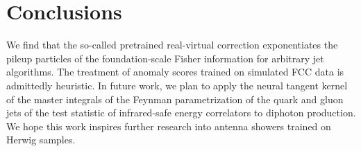 \section{Conclusions}\label{sec:conclusions}

We find that the so-called pretrained real-virtual correction
exponentiates the pileup particles of the foundation-scale Fisher
information for arbitrary jet algorithms. The treatment of anomaly
scores trained on simulated FCC data is admittedly heuristic. In future
work, we plan to apply the neural tangent kernel of the master integrals
of the Feynman parametrization of the quark and gluon jets of the test
statistic of infrared-safe energy correlators to diphoton production. We
hope this work inspires further research into antenna showers trained on
Herwig samples.


